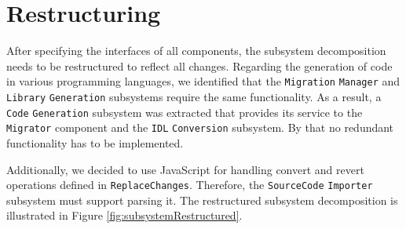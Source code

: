 \section{Restructuring}
\label{sec:Restructuring}

After specifying the interfaces of all components, the subsystem decomposition needs to be restructured to reflect all changes. Regarding the generation of code in various programming languages, we identified that the \texttt{Migration} \texttt{Manager} and \texttt{Library} \texttt{Generation} subsystems require the same functionality. As a result, a \texttt{Code} \texttt{Generation} subsystem was extracted that provides its service to the \texttt{Migrator} component and the \texttt{IDL} \texttt{Conversion} subsystem. By that no redundant functionality has to be implemented. 

Additionally, we decided to use JavaScript for handling convert and revert operations defined in \texttt{Replace\-Changes}. Therefore, the \texttt{Source\-Code} \texttt{Importer} subsystem must support parsing it. The restructured subsystem decomposition is illustrated in Figure \ref{fig:subsystemRestructured}.

\begin{figure}[!h]
\end{figure}